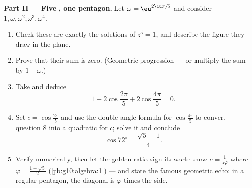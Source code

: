 \begin{problem}
\medskip
\noindent\textbf{Part II --- Five , one pentagon.}
Let $\omega = \eu^{2\iu\pi/5}$ and consider
$1, \omega, \omega^2, \omega^3, \omega^4$.
\begin{enumerate}[resume]
  \item Check these are exactly the solutions of $z^5 = 1$,
        and describe the figure they draw in the plane.
  \item Prove that their sum is zero. (Geometric progression
        --- or multiply the sum by $1 - \omega$.)
  \item Take  and deduce
        \[
        1 + 2\cos\frac{2\pi}{5} + 2\cos\frac{4\pi}{5} = 0 .
        \]
  \item Set $c = \cos\frac{2\pi}{5}$ and use the double-angle
        formula for $\cos\frac{4\pi}{5}$ to convert question 8
        into a quadratic  for $c$; solve it and
        conclude
        \[
        \cos 72^\circ = \frac{\sqrt5 - 1}{4} .
        \]
  \item Verify numerically, then let the golden ratio sign its
        work: show $c = \frac{1}{2\varphi}$ where
        $\varphi = \frac{1 + \sqrt5}{2}$
        (\cref{pb:g10:algebra:1}) --- and state the famous
        geometric echo: in a regular pentagon, the diagonal is
        $\varphi$ times the side.
\end{enumerate}


\end{problem}
